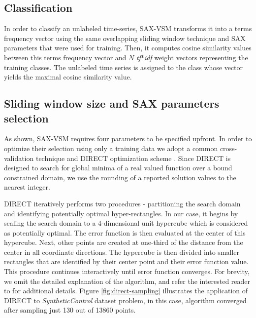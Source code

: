\documentclass[conference]{IEEEtran}
\begin{document}
\subsection{Classification}
In order to classify an unlabeled time-series, SAX-VSM transforms it into a
terms frequency vector using the same overlapping sliding window technique 
and SAX parameters that were used for training. 
Then, it computes cosine similarity values between this terms frequency vector 
and $N$ \textit{tf$\ast$idf} weight vectors representing the training classes. 
The unlabeled time series is assigned to the class whose vector yields the
maximal cosine similarity value.

\subsection{Sliding window size and SAX parameters selection} \label{section-direct}
As shown, SAX-VSM requires four parameters to be specified upfront. 
In order to optimize their selection using only a training data we adopt a common 
cross-validation technique and DIRECT optimization scheme \cite{direct-original}.
Since DIRECT is designed to search for global minima of a real valued function 
over a bound constrained domain, we use the rounding of a reported solution values 
to the nearest integer.

DIRECT iteratively performs two procedures - partitioning the search domain and identifying 
potentially optimal hyper-rectangles.
In our case, it begins by scaling the search domain to a 4-dimensional unit hypercube 
which is considered as potentially optimal. 
The error function is then evaluated at the center of this hypercube. Next, other points are 
created at one-third of the distance from the center in all coordinate directions. 
The hypercube is then divided into smaller rectangles that are identified by their center point 
and their error function value. This procedure continues interactively until error function
converges.
For brevity, we omit the detailed explanation of the algorithm, and refer the 
interested reader to \cite{direct} for additional details. Figure \ref{fig:direct-sampling} 
illustrates the application of DIRECT to \textit{SyntheticControl} dataset problem, 
in this case, algorithm converged after sampling just 130 out of 13860 points.
\end{document}
